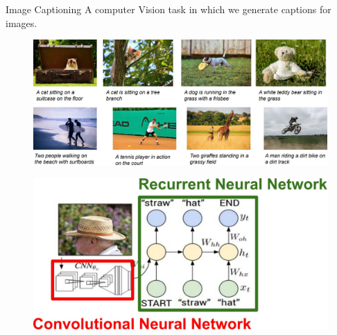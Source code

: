 \begin{frame}[allowframebreaks]{Image Captioning}
    A computer Vision task in which we generate captions for images.

    \begin{figure}
        \centering
        \includegraphics[width=1.05\textwidth,keepaspectratio]{images/rnn/slide_8_1_img.jpg}
    \end{figure}

    \framebreak

    \begin{figure}
        \centering
        \includegraphics[width=1.05\textwidth,keepaspectratio]{images/rnn/slide_9_1_img.jpg}
    \end{figure}
\end{frame}